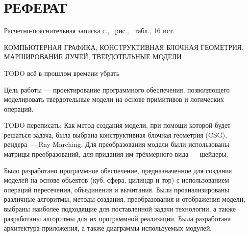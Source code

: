 \section*{РЕФЕРАТ}

Расчетно-пояснительная записка \pageref{LastPage} с., \totalfigures\ рис., \totaltables\ табл., 16 ист.

КОМПЬЮТЕРНАЯ ГРАФИКА, КОНСТРУКТИВНАЯ БЛОЧНАЯ ГЕОМЕТРИЯ, МАРШИРОВАНИЕ ЛУЧЕЙ, ТВЕРДОТЕЛЬНЫЕ МОДЕЛИ

TODO всё в прошлом времени убрать

Цель работы --- проектирование программного обеспечения, позволяющего моделировать твердотельные модели на основе примитивов и логических операций. 

TODO переписать: Как метод создания модели, при помощи которой будет 
решаться  задача,  была  выбрана  конструктивная  блочная геометрия  (CSG), 
рендера  ---  Ray Marching.
Для  преобразования  модели  были  использованы 
матрицы преобразований, для придания им трёхмерного вида --- шейдеры.

Было разработано  программное обеспечение, предназначенное для создания моделей на основе объектов (куб, 
сфера, цилиндр и тор) с использованием операций пересечения, объединения и 
вычитания.  
Были  проанализированы  различные  алгоритмы,  методы  создания, 
преобразования  и  отображения  модели,  выбраны  наиболее  подходящие  для поставленной  задачи  технологии,  а  также  разработаны  алгоритмы  для  их 
программной реализации. 
Была разработана архитектура приложения, а также 
диаграммы используемых модулей. 

\pagebreak